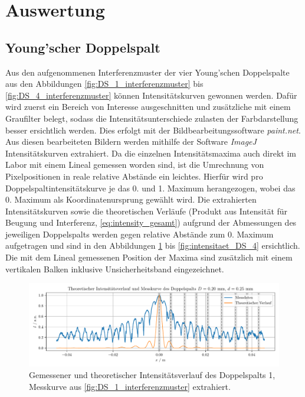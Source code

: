 \documentclass[ngerman]{scrartcl}
\begin{document}
\setcaphanging



\section{Auswertung}
\label{sec:auswertung}

\subsection{Young'scher Doppelspalt}
\label{subsec:auswertung_doppelspalt}

Aus den aufgenommenen Interferenzmuster der vier Young'schen Doppelspalte aus den Abbildungen \ref{fig:DS_1_interferenzmuster} bis \ref{fig:DS_4_interferenzmuster} können Intensitätskurven gewonnen werden. Dafür wird zuerst ein Bereich von Interesse ausgeschnitten und zusätzliche mit einem Graufilter belegt, sodass die Intensitätsunterschiede zulasten der Farbdarstellung besser ersichtlich werden. Dies erfolgt mit der Bildbearbeitungssoftware \textit{paint.net}. Aus diesen bearbeiteten Bildern werden mithilfe der Software \textit{ImageJ} Intensitätskurven extrahiert. Da die einzelnen Intensitätsmaxima auch direkt im Labor mit einem Lineal gemessen worden sind, ist die Umrechnung von Pixelpositionen in reale relative Abstände ein leichtes. Hierfür wird pro Doppelspaltintensitätskurve je das 0. und 1. Maximum herangezogen, wobei das 0. Maximum als Koordinatenursprung gewählt wird. Die extrahierten Intensitätskurven sowie die theoretischen Verläufe (Produkt aus Intensität für Beugung und Interferenz, \autoref{eq:intensity_gesamt}) aufgrund der Abmessungen des jeweiligen Doppelspalts werden gegen relative Abstände zum 0. Maximum aufgetragen und sind in den Abbildungen \ref{fig:intensitaet_DS_1} bis \ref{fig:intensitaet_DS_4} ersichtlich. Die mit dem Lineal gemessenen Position der Maxima sind zusätzlich mit einem vertikalen Balken inklusive Unsicherheitsband eingezeichnet.
%
\begin{figure}[H]
    \centering
    \begin{samepage}
        \includegraphics[width=\linewidth]{../python/plots/young_1.pdf}
        \caption[Intensitätskurve DS 1]{Gemessener und theoretischer Intensitätsverlauf des Doppelspalts 1, Messkurve aus \autoref{fig:DS_1_interferenzmuster} extrahiert.}
        \label{fig:intensitaet_DS_1}
    \end{samepage}
\end{figure}
\end{document}

